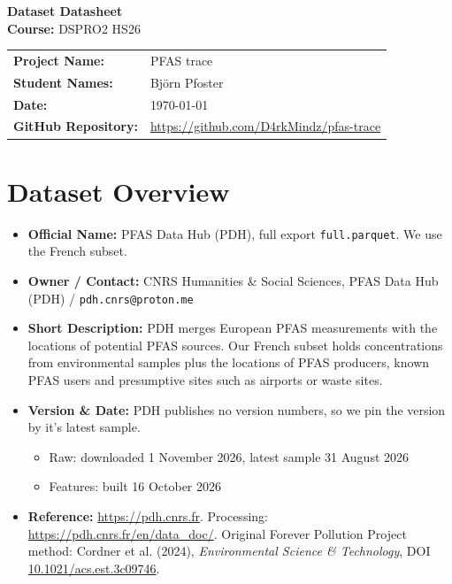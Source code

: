 \documentclass[11pt, a4paper]{article}
\newcommand{\code}[1]{\texttt{#1}}
\begin{document}
\begin{center}
    {\huge \bfseries \color{primaryBlue} Dataset Datasheet} \\[0.2cm]
    {\large \textbf{Course:} DSPRO2 HS26} \\[0.1cm]
\end{center}

\vspace{0.4cm}

\begin{studentbox}
    \begin{tabularx}{\textwidth}{l X}
        \textbf{Project Name:} & PFAS trace \\
        \textbf{Student Names:} & Björn Pfoster \\
        \textbf{Date:} & \today \\
        \textbf{GitHub Repository:} & \url{https://github.com/D4rkMindz/pfas-trace} \\
    \end{tabularx}
\end{studentbox}

\vspace{0.5cm}

\section{Dataset Overview}
\begin{itemize}
    \item \textbf{Official Name:} PFAS Data Hub (PDH), full export \code{full.parquet}. We use the French subset.
    \item \textbf{Owner / Contact:} CNRS Humanities \& Social Sciences, PFAS Data Hub (PDH) / \code{pdh.cnrs@proton.me}
    \item \textbf{Short Description:} PDH merges European PFAS measurements with the locations of potential PFAS sources. Our French subset holds concentrations from environmental samples plus the locations of PFAS producers, known PFAS users and presumptive sites such as airports or waste sites.
    \item \textbf{Version \& Date:} PDH publishes no version numbers, so we pin the version by it's latest sample.
    \begin{itemize}
        \item Raw: downloaded 1 November 2026, latest sample 31 August 2026
        \item Features: built 16 October 2026
    \end{itemize}
    \item \textbf{Reference:} \url{https://pdh.cnrs.fr}. Processing: \url{https://pdh.cnrs.fr/en/data_doc/}. Original Forever Pollution Project method: Cordner et al. (2024), \textit{Environmental Science \& Technology}, DOI \href{https://doi.org/10.1021/acs.est.3c09746}{10.1021/acs.est.3c09746}.
\end{itemize}
\end{document}
